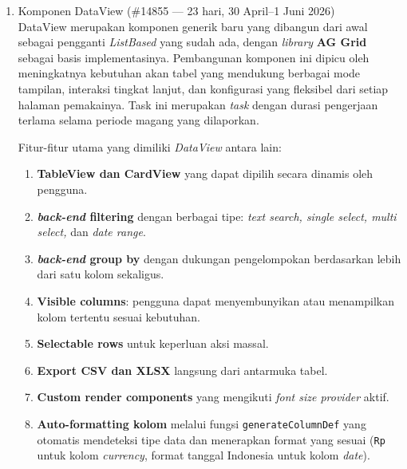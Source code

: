 \begin{enumerate}
    \item Komponen DataView (\#14855 --- 23 hari, 30 April--1 Juni 2026) \\ DataView
          merupakan komponen generik baru yang dibangun dari awal sebagai pengganti
          \textit{ListBased} yang sudah ada, dengan \textit{library} \textbf{AG Grid}
          sebagai basis implementasinya. Pembangunan komponen ini dipicu oleh
          meningkatnya kebutuhan akan tabel yang mendukung berbagai mode tampilan,
          interaksi tingkat lanjut, dan konfigurasi yang fleksibel dari setiap halaman
          pemakainya. Task ini merupakan \textit{task} dengan durasi pengerjaan terlama
          selama periode magang yang dilaporkan.

          Fitur-fitur utama yang dimiliki \textit{DataView} antara lain:
          \begin{enumerate}
              \item \textbf{TableView dan CardView} yang dapat dipilih secara dinamis oleh pengguna.
              \item \textbf{\textit{back-end} filtering} dengan berbagai tipe: \textit{text search, single select, multi select,} dan \textit{date range}.
              \item \textbf{\textit{back-end} group by} dengan dukungan pengelompokan berdasarkan lebih dari satu kolom sekaligus.
              \item \textbf{Visible columns}: pengguna dapat menyembunyikan atau menampilkan kolom tertentu sesuai kebutuhan.
              \item \textbf{Selectable rows} untuk keperluan aksi massal.
              \item \textbf{Export CSV dan XLSX} langsung dari antarmuka tabel.
              \item \textbf{Custom render components} yang mengikuti \textit{font size provider} aktif.
              \item \textbf{Auto-formatting kolom} melalui fungsi \texttt{generateColumnDef} yang otomatis mendeteksi tipe data dan menerapkan format yang sesuai (\texttt{Rp} untuk kolom \textit{currency}, format tanggal Indonesia untuk kolom \textit{date}).
          \end{enumerate}


\end{enumerate}
